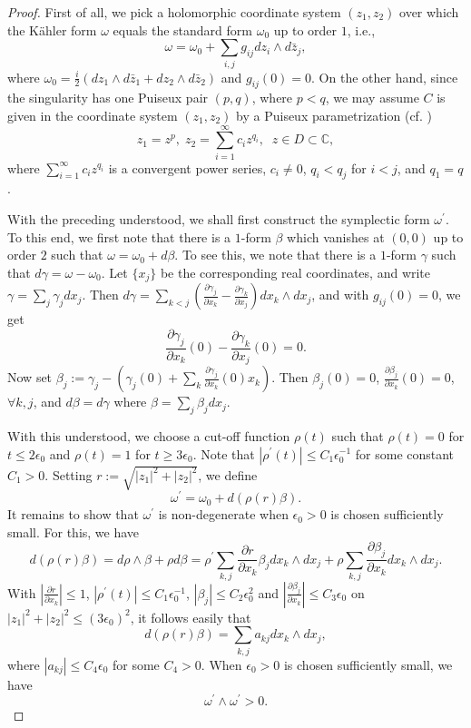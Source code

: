 \documentclass[11pt]{amsart}
\theoremstyle{plain}
\numberwithin{theorem}{section}
\theoremstyle{definition}
\newcommand{\C}{{\mathbb C}}
\begin{document}
\begin{proof}
First of all, we pick a holomorphic coordinate system $(z_1,z_2)$ over which
the K\"{a}hler form $\omega$ equals the standard form $\omega_0$ up to order $1$, i.e., 
$$
\omega=\omega_0+\sum_{i,j} g_{ij} dz_i\wedge d\bar{z}_j, 
$$
where $\omega_0=\frac{i}{2}(dz_1\wedge d\bar{z}_1+dz_2\wedge d\bar{z}_2)$ and $g_{ij}(0)=0$. 
On the other hand, since the singularity has one Puiseux pair $(p,q)$, where $p<q$, we may assume 
$C$ is given in the coordinate system $(z_1,z_2)$ by a Puiseux parametrization (cf. \cite{BK})
$$
z_1=z^p, \; z_2=\sum_{i=1}^\infty c_i z^{q_i}, \;\; z\in D\subset \C,
$$
where $\sum_{i=1}^\infty c_i z^{q_i}$ is a convergent power series, $c_i\neq 0$, $q_i<q_j$ for
$i<j$, and $q_1=q$. 

With the preceding understood, we shall first construct the symplectic form $\omega^\prime$. 
To this end, we first note that there is a $1$-form $\beta$ which vanishes at $(0,0)$ up to order $2$
such that $\omega=\omega_0+d\beta$. To see this, we note that there is a $1$-form $\gamma$
such that $d\gamma=\omega-\omega_0$. Let $\{x_j\}$ be the corresponding real coordinates, and 
write $\gamma=\sum_j\gamma_j dx_j$. Then 
$d\gamma=\sum_{k<j}(\frac{\partial \gamma_j}{\partial x_k}-\frac{\partial \gamma_k}{\partial x_j})
dx_k\wedge dx_j$, and with $g_{ij}(0)=0$, we get
$$
\frac{\partial \gamma_j}{\partial x_k}(0)-\frac{\partial \gamma_k}{\partial x_j}(0)=0. 
$$
Now set $\beta_j:=\gamma_j-(\gamma_j(0)+\sum_k \frac{\partial \gamma_j}{\partial x_k}(0)x_k)$. 
Then $\beta_j(0)=0$, $\frac{\partial \beta_j}{\partial x_k}(0)=0$, $\forall k,j$, and
$d\beta=d\gamma$ where $\beta=\sum_j \beta_jdx_j$.

With this understood, we choose a cut-off function $\rho(t)$ such that $\rho(t)=0$ for 
$t\leq 2\epsilon_0$ and $\rho(t)=1$ for $t\geq 3\epsilon_0$. Note that $|\rho^\prime(t)|\leq C_1\epsilon_0^{-1}$ for some constant $C_1>0$. Setting $r:=\sqrt{|z_1|^2+|z_2|^2}$, we
define
$$
\omega^\prime=\omega_0+d(\rho(r)\beta). 
$$
It remains to show that $\omega^\prime$ is non-degenerate when $\epsilon_0>0$ is chosen
sufficiently small. For this, we have 
$$
d(\rho(r)\beta)=d\rho \wedge \beta+\rho d\beta=\rho^\prime \sum_{k,j} \frac{\partial r}{\partial x_k}\beta_jdx_k\wedge dx_j+\rho \sum_{k,j}\frac{\partial \beta_j}{\partial x_k} dx_k\wedge dx_j.
$$
With $|\frac{\partial r}{\partial x_k}|\leq 1$, $|\rho^\prime(t)|\leq C_1\epsilon_0^{-1}$,
$|\beta_j|\leq C_2\epsilon_0^2$ and $|\frac{\partial \beta_j}{\partial x_k}|\leq C_3\epsilon_0$
on $|z_1|^2+|z_2|^2\leq (3\epsilon_0)^2$, it follows easily that 
$$
d(\rho(r)\beta)=\sum_{k,j} a_{kj} dx_k\wedge dx_j, 
$$
where $|a_{kj}|\leq C_4 \epsilon_0$ for some $C_4>0$. When $\epsilon_0>0$ is chosen
sufficiently small, we have $$\omega^\prime\wedge \omega^\prime>0.$$


\end{proof}
\end{document}

